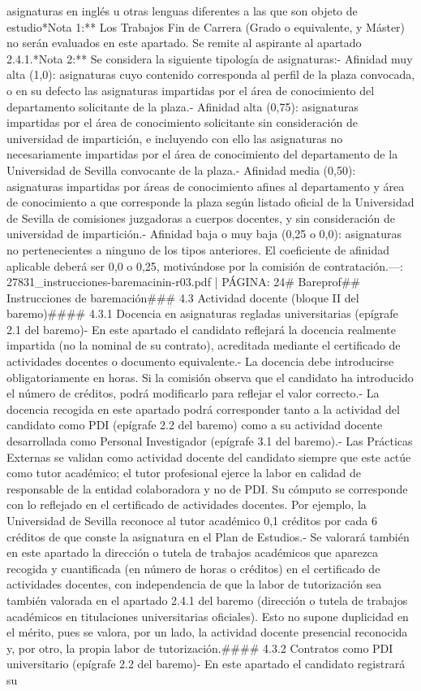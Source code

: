 \documentclass{article}
\begin{document}
\begin{itemize}
{{{asignaturas en inglés u otras lenguas diferentes a las que son objeto de estudio\n\n**Nota 1:** Los Trabajos Fin de Carrera (Grado o equivalente, y Máster) no serán evaluados en este apartado. Se remite al aspirante al apartado 2.4.1.\n**Nota 2:** Se considera la siguiente tipología de asignaturas:\n- Afinidad muy alta (1,0): asignaturas cuyo contenido corresponda al perfil de la plaza convocada, o en su defecto las asignaturas impartidas por el área de conocimiento del departamento solicitante de la plaza.\n- Afinidad alta  (0,75): asignaturas impartidas por el área de conocimiento solicitante sin consideración de universidad de impartición, e incluyendo con ello las asignaturas no necesariamente impartidas por el área de conocimiento del departamento de la Universidad de Sevilla convocante de la plaza.\n- Afinidad media  (0,50): asignaturas impartidas por áreas de conocimiento afines al departamento y área de conocimiento a que corresponde la plaza según listado oficial de la Universidad de Sevilla de comisiones juzgadoras a cuerpos docentes, y sin consideración de universidad de impartición.\n- Afinidad baja o muy baja      (0,25 o 0,0): asignaturas no pertenecientes a ninguno de los tipos anteriores. El coeficiente de afinidad aplicable deberá ser 0,0 o 0,25, motivándose por la comisión de contratación.\n\n---\n\nFUENTE: 27831_instrucciones-baremacinin-r03.pdf | PÁGINA: 24\n# Bareprof\n## Instrucciones de baremación\n\n### 4.3 Actividad docente (bloque II del baremo)\n\n#### 4.3.1 Docencia en asignaturas regladas universitarias (epígrafe 2.1 del baremo)\n\n- En este apartado el candidato reflejará la docencia realmente impartida (no la nominal de su contrato), acreditada mediante el certificado de actividades docentes o documento equivalente.\n- La docencia debe introducirse obligatoriamente en horas. Si la comisión observa que el candidato ha introducido el número de créditos, podrá modificarlo para reflejar el valor correcto.\n- La docencia recogida en este apartado podrá corresponder tanto a la actividad del candidato como PDI (epígrafe 2.2 del baremo) como a su actividad docente desarrollada como Personal Investigador (epígrafe 3.1 del baremo).\n- Las Prácticas Externas se validan como actividad docente del candidato siempre que este actúe como tutor académico; el tutor profesional ejerce la labor en calidad de responsable de la entidad colaboradora y no de PDI. Su cómputo se corresponde con lo reflejado en el certificado de actividades docentes. Por ejemplo, la Universidad de Sevilla reconoce al tutor académico 0,1 créditos por cada 6 créditos de que conste la asignatura en el Plan de Estudios.\n- Se valorará también en este apartado la dirección o tutela de trabajos académicos que aparezca recogida y cuantificada (en número de horas o créditos) en el certificado de actividades docentes, con independencia de que la labor de tutorización sea también valorada en el apartado 2.4.1 del baremo (dirección o tutela de trabajos académicos en titulaciones universitarias oficiales). Esto no supone duplicidad en el mérito, pues se valora, por un lado, la actividad docente presencial reconocida y, por otro, la propia labor de tutorización.\n\n#### 4.3.2 Contratos como PDI universitario (epígrafe 2.2 del baremo)\n\n- En este apartado el candidato registrará su }}}
\end{itemize}
\end{document}
